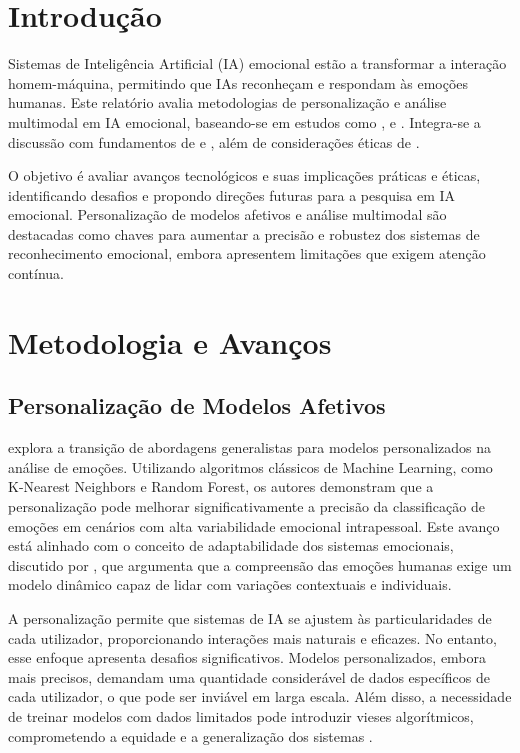 \documentclass[a4paper,12pt]{report}
\begin{document}
	\newpage

	
	
	\section{Introdução}
	
	Sistemas de Inteligência Artificial (IA) emocional estão a transformar a interação homem-máquina, permitindo que IAs reconheçam e respondam às emoções humanas. Este relatório avalia metodologias de personalização e análise multimodal em IA emocional, baseando-se em estudos como \textcite{kargarandehkordi2024}, \textcite{gursesli2024} e \textcite{lee2024}. Integra-se a discussão com fundamentos de \textcite{picard1997} e \textcite{pessoa2013}, além de considerações éticas de \textcite{mueller2020}.
	
	O objetivo é avaliar avanços tecnológicos e suas implicações práticas e éticas, identificando desafios e propondo direções futuras para a pesquisa em IA emocional. Personalização de modelos afetivos e análise multimodal são destacadas como chaves para aumentar a precisão e robustez dos sistemas de reconhecimento emocional, embora apresentem limitações que exigem atenção contínua.
	
	
	\section{Metodologia e Avanços}
	
	\subsection{Personalização de Modelos Afetivos}
	
	\textcite{kargarandehkordi2024} explora a transição de abordagens generalistas para modelos personalizados na análise de emoções. Utilizando algoritmos clássicos de Machine Learning, como K-Nearest Neighbors e Random Forest, os autores demonstram que a personalização pode melhorar significativamente a precisão da classificação de emoções em cenários com alta variabilidade emocional intrapessoal. Este avanço está alinhado com o conceito de adaptabilidade dos sistemas emocionais, discutido por \textcite{picard1997}, que argumenta que a compreensão das emoções humanas exige um modelo dinâmico capaz de lidar com variações contextuais e individuais.
	
	A personalização permite que sistemas de IA se ajustem às particularidades de cada utilizador, proporcionando interações mais naturais e eficazes. No entanto, esse enfoque apresenta desafios significativos. Modelos personalizados, embora mais precisos, demandam uma quantidade considerável de dados específicos de cada utilizador, o que pode ser inviável em larga escala. Além disso, a necessidade de treinar modelos com dados limitados pode introduzir vieses algorítmicos, comprometendo a equidade e a generalização dos sistemas \parencite{mueller2020}.
	
\end{document}
